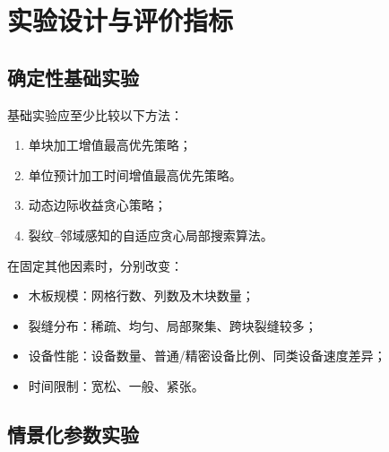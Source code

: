 ﻿\documentclass[UTF8,12pt,a4paper]{ctexart}
\begin{document}
\section{实验设计与评价指标}

\subsection{确定性基础实验}

\begin{description}[leftmargin=2em,labelsep=0.5em,itemsep=0.6em]
  \item[\textbf{比较方法：}]
基础实验应至少比较以下方法：

\begin{enumerate}
  \item 单块加工增值最高优先策略；
  \item 单位预计加工时间增值最高优先策略。
  \item 动态边际收益贪心策略；
  \item 裂纹--邻域感知的自适应贪心局部搜索算法。
\end{enumerate}

  \item[\textbf{控制变量：}]
在固定其他因素时，分别改变：

\begin{itemize}
  \item 木板规模：网格行数、列数及木块数量；
  \item 裂缝分布：稀疏、均匀、局部聚集、跨块裂缝较多；
  \item 设备性能：设备数量、普通/精密设备比例、同类设备速度差异；
  \item 时间限制：宽松、一般、紧张。
\end{itemize}
\end{description}

\subsection{情景化参数实验}
\end{document}
